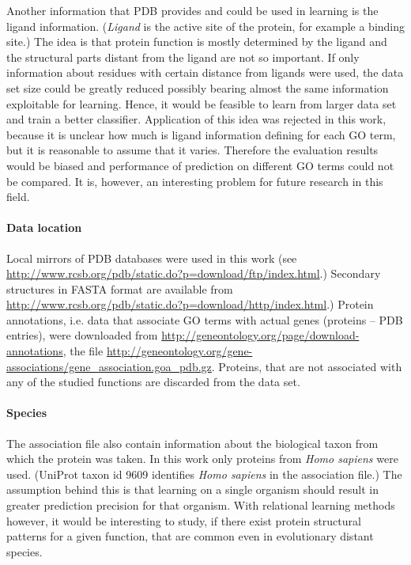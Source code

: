 \documentclass[11pt,twoside,a4paper]{book}
\begin{document}
Another information that PDB provides and could be used in learning is the ligand information.
(\emph{Ligand} is the active site of the protein, for example a binding site.) 
The idea is that protein function is mostly determined by the ligand and the structural parts 
distant from the ligand are not so important.
If only information about residues with certain distance from ligands were used,
the data set size could be greatly reduced possibly bearing almost the same information
exploitable for learning.
Hence, it would be feasible to learn from larger data set and train a better classifier.
Application of this idea was rejected in this work,
because it is unclear how much is ligand information defining for each GO term,
but it is reasonable to assume that it varies. 
Therefore the evaluation results would be biased and performance of prediction
on different GO terms could not be compared.
It is, however, an interesting problem for future research in this field.

\paragraph{Data location} Local mirrors of PDB databases were used in this work (see \url{http://www.rcsb.org/pdb/static.do?p=download/ftp/index.html}.)
Secondary structures in FASTA format are available from \url{http://www.rcsb.org/pdb/static.do?p=download/http/index.html}.)
Protein annotations, i.e. data that associate GO terms with actual genes (proteins -- PDB entries), were downloaded from
\url{http://geneontology.org/page/download-annotations}, 
the file \url{http://geneontology.org/gene-associations/gene_association.goa_pdb.gz}.
Proteins, that are not associated with any of the studied functions are discarded from the data set.

\paragraph{Species} The association file also contain information about the biological taxon from which the protein was taken.
In this work only proteins from \emph{Homo sapiens} were used.
(UniProt taxon id 9609 identifies \emph{Homo sapiens} in the association file.) 
The assumption behind this is that learning on a single organism should result in
greater prediction precision for that organism.
With relational learning methods however, it would be interesting to study, if there exist protein
structural patterns for a given function, that are common even in evolutionary distant species.
\end{document}

